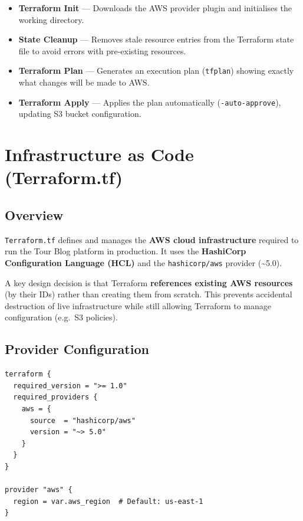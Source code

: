 \documentclass[12pt,a4paper]{report}
\begin{document}
\begin{itemize}[leftmargin=2em]
  \item \textbf{Terraform Init} — Downloads the AWS provider plugin and initialises the working directory.
  \item \textbf{State Cleanup} — Removes stale resource entries from the Terraform state file to avoid errors with pre-existing resources.
  \item \textbf{Terraform Plan} — Generates an execution plan (\texttt{tfplan}) showing exactly what changes will be made to AWS.
  \item \textbf{Terraform Apply} — Applies the plan automatically (\texttt{-auto-approve}), updating S3 bucket configuration.
\end{itemize}

\chapter{Infrastructure as Code (Terraform.tf)}

\section{Overview}

\texttt{Terraform.tf} defines and manages the \textbf{AWS cloud infrastructure} required to run the Tour Blog platform in production. It uses the \textbf{HashiCorp Configuration Language (HCL)} and the \texttt{hashicorp/aws} provider (\textasciitilde 5.0).

A key design decision is that Terraform \textbf{references existing AWS resources} (by their IDs) rather than creating them from scratch. This prevents accidental destruction of live infrastructure while still allowing Terraform to manage configuration (e.g.\ S3 policies).

\section{Provider Configuration}

\begin{lstlisting}[caption={Provider block}]
terraform {
  required_version = ">= 1.0"
  required_providers {
    aws = {
      source  = "hashicorp/aws"
      version = "~> 5.0"
    }
  }
}

provider "aws" {
  region = var.aws_region  # Default: us-east-1
}
\end{lstlisting}
\end{document}
